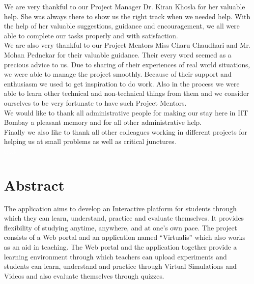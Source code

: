 \documentclass[12pt]{report}
\begin{document}
We are very thankful to our Project Manager Dr. Kiran Khosla for her valuable help. She was always there to show us the right track when we needed help. With the help of her valuable suggestions, guidance and encouragement, we all were able to complete our tasks properly and with satisfaction. \\

We are also very thankful to our Project Mentors Miss Charu Chaudhari and Mr. Mohan Pednekar for their valuable guidance. Their every word seemed as a precious advice to us. Due to sharing of their experiences of real world situations, we were able to manage the project smoothly. Because of their support and enthusiasm we used to get inspiration to do work. Also in the process we were able to learn other technical and non-technical things from them and we consider ourselves to be very fortunate to have such Project Mentors. \\

We would like to thank all administrative people for making our stay here in IIT Bombay a pleasant memory and for all other administrative help.
\\
Finally we also like to thank all other colleagues working in different projects for helping us at small problems as well as critical junctures.
\\

 \pagebreak \thispagestyle{empty} \textcolor{white}{text} \pagebreak



\chapter*{Abstract}
\setcounter{page}{1}
The application aims to develop an Interactive platform for students through which they can learn, understand, practice and evaluate themselves. It provides flexibility of studying anytime, anywhere, and at one's own pace. The project consists of a Web portal and an application named “Virtualis” which also works as an aid in teaching. The Web portal and the application together provide a learning environment through which teachers can upload experiments and students can learn, understand and practice through Virtual Simulations and Videos and also evaluate themselves through quizzes.\newline
\end{document}
